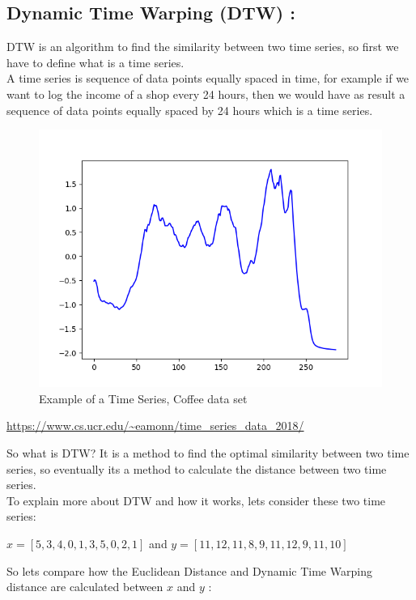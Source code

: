 \documentclass[10pt,a4paper]{article}
\begin{document}
\subsection{Dynamic Time Warping (DTW) :}
DTW is an algorithm to find the similarity between two time series, so first we have to define what is a time series.\\
A time series is sequence of data points equally spaced in time, for example if we want to log the income of a shop every 24 hours, then we would have as result a sequence of data points equally spaced by 24 hours which is a time series.
\begin{figure}[H]
\centering
\includegraphics[scale=0.5]{Coffee.png}
\caption{Example of a Time Series, Coffee data set}
\end{figure}
\begin{center}
\small\url{https://www.cs.ucr.edu/~eamonn/time_series_data_2018/}
\end{center}
So what is DTW? It is a method to find the optimal similarity between two time series, so eventually its a method to calculate the distance between two time series.\\
To explain more about DTW and how it works, lets consider these two time series:

\begin{center}
$ x = [5,3,4,0,1,3,5,0,2,1] $ and $ y = [11,12,11,8,9,11,12,9,11,10] $
\end{center}

So lets compare how the Euclidean Distance and Dynamic Time Warping distance are calculated between $ x $ and $ y $ :
\end{document}
